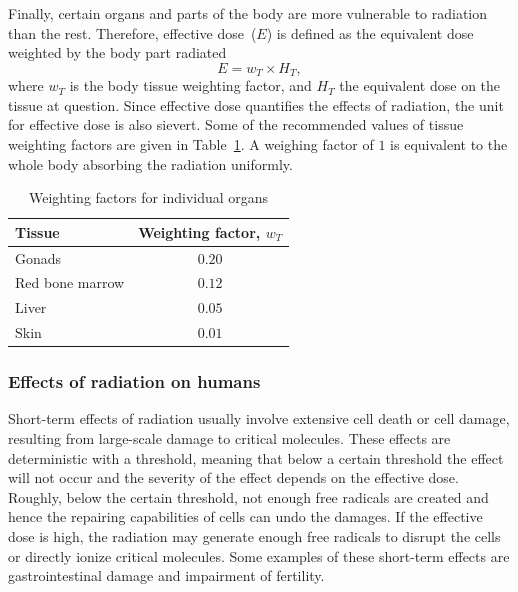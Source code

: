 \documentclass[nofootinbib,preprint,aps]{revtex4-1}
\begin{document}
        Finally, certain organs and parts of the body are more vulnerable to radiation than the rest.
        Therefore, effective dose~($E$) is defined as the equivalent dose weighted by the body part
        radiated
        \begin{equation}
            E = w_T \times H_T,
        \end{equation}
        where $w_T$ is the body tissue weighting factor, and $H_T$ the equivalent dose on the tissue
        at question. Since effective dose quantifies the effects of radiation, the unit for effective dose
        is also sievert.
        Some of the recommended values of tissue
        weighting factors are given in Table~\ref{tab:eff}. A weighing factor of $1$ is equivalent to the
        whole body absorbing the radiation uniformly.
        \begin{table}
            \centering
            \caption{Weighting factors for individual organs \cite{icrp74}}
            \begin{ruledtabular}
                \begin{tabular}{l c}
                Tissue & Weighting factor, $w_T$\\
                \hline
                Gonads & $0.20$\\
                Red bone marrow & $0.12$ \\
                Liver & $0.05$ \\
                Skin & $0.01$ \\
                \end{tabular}
                \label{tab:eff}
            \end{ruledtabular}
        \end{table}

        \subsubsection{Effects of radiation on humans}
        Short-term effects of radiation usually involve extensive cell death or cell damage, resulting
        from large-scale damage to critical molecules.\cite{u16}
        These effects are deterministic with a threshold,
        meaning that below a certain threshold the effect will not occur and
        the severity of the effect depends on the effective dose. Roughly, below the certain threshold,
        not enough free radicals are created and hence the repairing capabilities of cells can undo the damages.
        If the effective dose is high, the radiation may generate enough free radicals to disrupt the cells or directly
        ionize critical molecules. Some examples of these short-term effects are gastrointestinal damage and impairment
        of fertility.\cite{u16}
\end{document}
